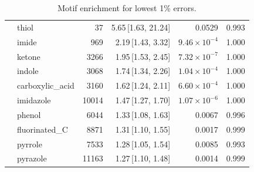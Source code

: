 \begin{table}[t]
\begin{tabular}{llrrrr}
      & thiol & 37 & 5.65\,[1.63, 21.24] & 0.0529 & 0.993 \\
      & imide & 969 & 2.19\,[1.43, 3.32] & $9.46\times 10^{-4}$ & 1.000 \\
      & ketone & 3266 & 1.95\,[1.53, 2.45] & $7.32\times 10^{-7}$ & 1.000 \\
      & indole & 3068 & 1.74\,[1.34, 2.26] & $1.04\times 10^{-4}$ & 1.000 \\
      & carboxylic\_acid & 3160 & 1.62\,[1.24, 2.11] & $6.60\times 10^{-4}$ & 1.000 \\
      & imidazole & 10014 & 1.47\,[1.27, 1.70] & $1.07\times 10^{-6}$ & 1.000 \\
      & phenol & 6044 & 1.33\,[1.08, 1.63] & 0.0067 & 0.996 \\
      & fluorinated\_C & 8871 & 1.31\,[1.10, 1.55] & 0.0017 & 0.999 \\
      & pyrrole & 7533 & 1.28\,[1.05, 1.54] & 0.0085 & 0.993 \\
      & pyrazole & 11163 & 1.27\,[1.10, 1.48] & 0.0014 & 0.999 \\
    \hline
  \end{tabular}
  \caption{Motif enrichment for lowest 1\% errors.}
  \label{tab:split_structure_best}
\end{table}